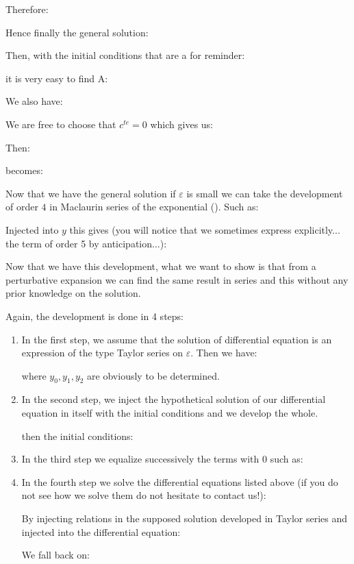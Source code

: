 	Therefore:
	
	Hence finally the general solution:
	
	Then, with the initial conditions that are a for reminder:
	
	it is very easy to find A:
	
	We also have:
	
	We are free to choose that $c^{te}=0$ which gives us:
	
	Then:
	
	becomes:
	
	Now that we have the general solution if $\varepsilon$ is small we can take the development of order $4$ in Maclaurin series of the exponential (). Such as:
	
	Injected into $y$ this gives (you will notice that we sometimes express explicitly... the term of order 5 by anticipation...):
	
	Now that we have this development, what we want to show is that from a perturbative expansion we can find the same result in series and this without any prior knowledge on the solution.
	
	Again, the development is done in 4 steps:
	\begin{enumerate}
		\item In the first step, we assume that the solution of differential equation is an expression of the type Taylor series on  $\varepsilon$. Then we have:
		
		where $y_0,y_1,y_2$ are obviously to be determined.
		
		\item In the second step, we inject the hypothetical solution of our differential equation in itself with the initial conditions and we develop the whole.
		
		then the initial conditions:
		
	
		\item In the third step we equalize successively the terms with $0$ such as:
		
		
		\item In the fourth step we solve the differential equations listed above (if you do not see how we solve them do not hesitate to contact us!):
		
		By injecting relations in the supposed solution developed in Taylor series and injected into the differential equation:
		
		We fall back on:
		
	\end{enumerate}
	
